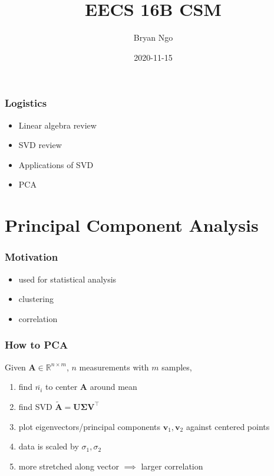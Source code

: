\documentclass[aspectratio=169]{beamer}
\title{EECS 16B CSM}
\author{Bryan Ngo}
\date{2020-11-15}
\institute{UC Berkeley}
\newcommand{\R}{\mathbb{R}}
\begin{document}
\begin{frame}
    \maketitle
\end{frame}

\begin{frame}
    \frametitle{Logistics}

    \begin{itemize}
        \item Linear algebra review
        \item SVD review
        \item Applications of SVD
        \item PCA
    \end{itemize}
\end{frame}

\section{Principal Component Analysis}

\begin{frame}
    \frametitle{Motivation}

    \begin{itemize}
        \item used for statistical analysis
        \item clustering
        \item correlation
    \end{itemize}
\end{frame}

\begin{frame}
    \frametitle{How to PCA}

    Given \(\bm{A} \in \R^{n \times m}\), \(n\) measurements with \(m\) samples,
    \begin{enumerate}
        \item find \(\overline{n_i}\) to center \(\bm{A}\) around mean
        \item find SVD \(\widetilde{\bm{A}} = \bm{U \Sigma V}^\top\)
        \item plot eigenvectors/principal components \(\bm{v}_1, \bm{v}_2\) against centered points
        \item data is scaled by \(\sigma_1, \sigma_2\)
        \item more stretched along vector \(\implies\) larger correlation
    \end{enumerate}
\end{frame}
\end{document}
